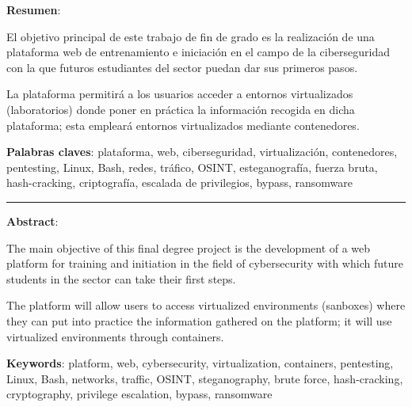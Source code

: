 \textbf{Resumen}:

El objetivo principal de este trabajo de fin de grado es la realización de una plataforma web de entrenamiento e iniciación en el campo de la ciberseguridad con la que futuros estudiantes del sector puedan dar sus primeros pasos.

La plataforma permitirá a los usuarios acceder a entornos virtualizados (laboratorios) donde poner en práctica la información recogida en dicha plataforma; esta empleará entornos virtualizados mediante contenedores.

\vspace{1cm}

\textbf{Palabras claves}: plataforma, web, ciberseguridad, virtualización, contenedores, pentesting, Linux, Bash, redes, tráfico, OSINT, esteganografía, fuerza bruta, hash-cracking, criptografía, escalada de privilegios, bypass, ransomware


\vspace{1cm}

\begin{center}

    \rule{0.5\textwidth}{0.5 pt}

\end{center}

\vspace{1cm}


\textbf{Abstract}:

The main objective of this final degree project is the development of a web platform for training and initiation in the field of cybersecurity with which future students in the sector can take their first steps.

The platform will allow users to access virtualized environments (sanboxes) where they can put into practice the information gathered on the platform; it will use virtualized environments through containers.

\vspace{1cm}

\textbf{Keywords}: platform, web, cybersecurity, virtualization, containers, pentesting, Linux, Bash, networks, traffic, OSINT, steganography, brute force, hash-cracking, cryptography, privilege escalation, bypass, ransomware
